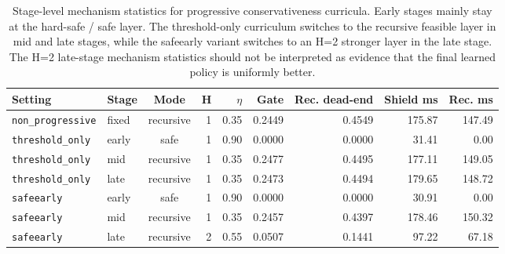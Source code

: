 \begin{table}[t]
\centering
\caption{Stage-level mechanism statistics for progressive conservativeness curricula. Early stages mainly stay at the hard-safe / safe layer. The threshold-only curriculum switches to the recursive feasible layer in mid and late stages, while the safeearly variant switches to an H=2 stronger layer in the late stage. The H=2 late-stage mechanism statistics should not be interpreted as evidence that the final learned policy is uniformly better.}
\label{tab:progressive-stage-mechanism}
\small
\begin{tabular}{llcrrrrrr}
\toprule
Setting & Stage & Mode & H & $\eta$ & Gate & Rec. dead-end & Shield ms & Rec. ms \\
\midrule
\texttt{non\_progressive} & fixed & recursive & 1 & 0.35 & 0.2449 & 0.4549 & 175.87 & 147.49 \\
\texttt{threshold\_only} & early & safe & 1 & 0.90 & 0.0000 & 0.0000 & 31.41 & 0.00 \\
\texttt{threshold\_only} & mid & recursive & 1 & 0.35 & 0.2477 & 0.4495 & 177.11 & 149.05 \\
\texttt{threshold\_only} & late & recursive & 1 & 0.35 & 0.2473 & 0.4494 & 179.65 & 148.72 \\
\texttt{safeearly} & early & safe & 1 & 0.90 & 0.0000 & 0.0000 & 30.91 & 0.00 \\
\texttt{safeearly} & mid & recursive & 1 & 0.35 & 0.2457 & 0.4397 & 178.46 & 150.32 \\
\texttt{safeearly} & late & recursive & 2 & 0.55 & 0.0507 & 0.1441 & 97.22 & 67.18 \\
\bottomrule
\end{tabular}
\end{table}
